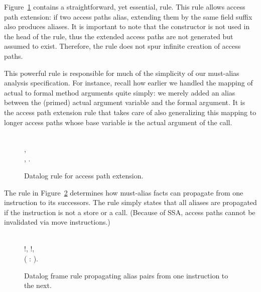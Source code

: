 Figure~\ref{fig:must-logic:accesspathext} contains a straightforward, yet essential, rule. This rule allows access path extension: if two access paths alias, extending them by the same field suffix also produces aliases. It is important to note that the constructor  is not used in the head of the rule, thus the extended access paths are not generated but assumed to exist. Therefore, the rule does not spur infinite creation of access paths.

This powerful rule is responsible for much of the simplicity of our must-alias analysis specification. For instance, recall how earlier we handled the mapping of actual to formal method arguments quite simply: we merely added an alias between the (primed) actual argument variable and the formal argument. It is the access path extension rule that takes care of also generalizing this mapping to longer access paths whose base variable is the actual argument of the call.

\begin{figure}[htp]
\begin{datalog}
 \dlIf{} \\
    , \\
    , .
\end{datalog}
\caption[]{Datalog rule for access path extension.}
\label{fig:must-logic:accesspathext}
\end{figure}


The rule in Figure~\ref{fig:must-logic:framerules} determines how must-alias facts can propagate from one instruction to its successors. The rule simply states that all aliases are propagated if the instruction is not a store or a call. (Because of SSA, access paths cannot be invalidated via move instructions.)

\begin{figure}[htp]
\begin{datalog}
 \dlIf{} \\
    !, !, \\
    (\dlforall{} :  \dlThen{} ).
\end{datalog}
\caption[]{Datalog frame rule propagating alias pairs from one instruction to the next.}
\label{fig:must-logic:framerules}
\end{figure}



